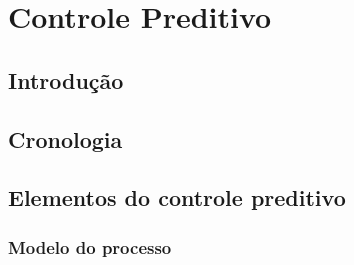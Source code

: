\chapter{Controle Preditivo}
\label{ch:controle_preditivo}

\section{Introdução}


\section{Cronologia}
\label{sec:cronologia}


\section{Elementos do controle preditivo}
\label{sec:elementos_do_controle_preditivo}


\subsection{Modelo do processo}
\label{subsec:modelo_do_processo}

